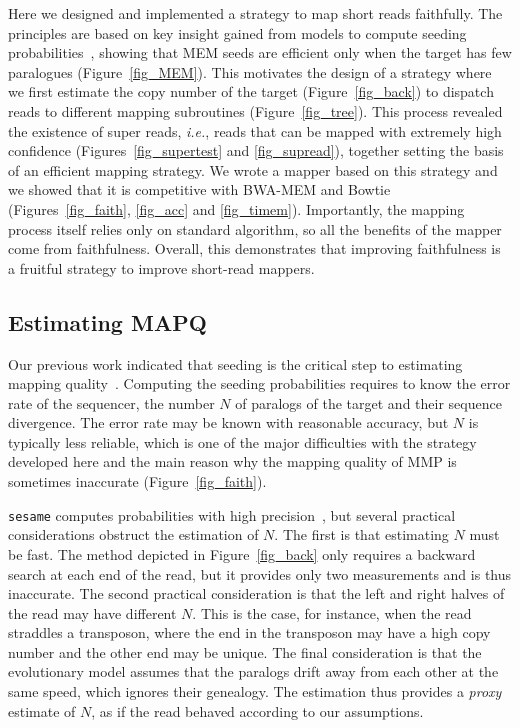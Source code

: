 \documentclass[a4,center,fleqn]{NAR}
\begin{document}
Here we designed and implemented a strategy to map short reads faithfully.
The principles are based on key insight gained from models to compute
seeding probabilities~\cite{Filion619155}, showing that MEM seeds are
efficient only when the target has few paralogues (Figure~\ref{fig_MEM}).
This motivates the design of a strategy where we first estimate the copy
number of the target (Figure~\ref{fig_back}) to dispatch reads to
different mapping subroutines (Figure~\ref{fig_tree}). This process
revealed the existence of super reads, \textit{i.e.}, reads that can be
mapped with extremely high confidence (Figures~\ref{fig_supertest} and
\ref{fig_supread}), together setting the basis of an efficient mapping
strategy. We wrote a mapper based on this strategy and we showed that it
is competitive with BWA-MEM and Bowtie (Figures~\ref{fig_faith},
\ref{fig_acc} and \ref{fig_timem}). Importantly, the mapping process
itself relies only on standard algorithm, so all the benefits of the
mapper come from faithfulness. Overall, this demonstrates that improving
faithfulness is a fruitful strategy to improve short-read mappers.


\subsection{Estimating MAPQ}

Our previous work indicated that seeding is the critical step to
estimating mapping quality~\cite{Filion619155}. Computing the seeding
probabilities requires to know the error rate of the sequencer, the number
$N$ of paralogs of the target and their sequence divergence. The error
rate may be known with reasonable accuracy, but $N$ is typically less
reliable, which is one of the major difficulties with the strategy
developed here and the main reason why the mapping quality of MMP is
sometimes inaccurate (Figure~\ref{fig_faith}).

\texttt{sesame} computes probabilities with high
precision~\cite{Filion619155}, but several practical considerations
obstruct the estimation of $N$. The first is that estimating $N$ must be
fast. The method depicted in Figure~\ref{fig_back} only requires a
backward search at each end of the read, but it provides only two
measurements and is thus inaccurate. The second practical consideration is
that the left and right halves of the read may have different $N$. This is
the case, for instance, when the read straddles a transposon, where the
end in the transposon may have a high copy number and the other end may be
unique. The final consideration is that the evolutionary model assumes
that the paralogs drift away from each other at the same speed, which
ignores their genealogy. The estimation thus provides a \emph{proxy}
estimate of $N$, as if the read behaved according to our assumptions.
\end{document}
